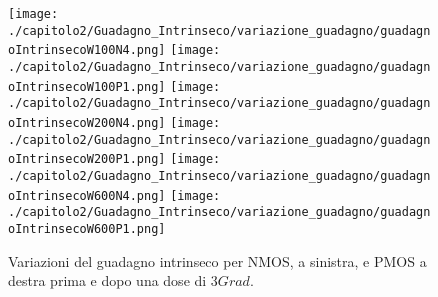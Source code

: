 \begin{figure}[ht]
    \centering
    \texttt{[image: ./capitolo2/Guadagno\_Intrinseco/variazione\_guadagno/guadagnoIntrinsecoW100N4.png]}
    \texttt{[image: ./capitolo2/Guadagno\_Intrinseco/variazione\_guadagno/guadagnoIntrinsecoW100P1.png]}
    \texttt{[image: ./capitolo2/Guadagno\_Intrinseco/variazione\_guadagno/guadagnoIntrinsecoW200N4.png]}
    \texttt{[image: ./capitolo2/Guadagno\_Intrinseco/variazione\_guadagno/guadagnoIntrinsecoW200P1.png]}
    \texttt{[image: ./capitolo2/Guadagno\_Intrinseco/variazione\_guadagno/guadagnoIntrinsecoW600N4.png]}
    \texttt{[image: ./capitolo2/Guadagno\_Intrinseco/variazione\_guadagno/guadagnoIntrinsecoW600P1.png]}

    \caption[Variazione del guadagno intrinseco pre e pos irraggiamento]{Variazioni del guadagno intrinseco per NMOS, a sinistra, e PMOS a destra prima e dopo una dose di $3Grad$.}
    \label{fig:variazione_guadagnoIntrinseco}
\end{figure}